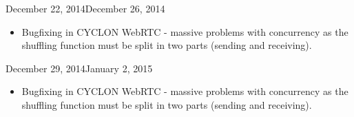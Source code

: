 \documentclass[11pt, english, screen]{report-rd-info}
\begin{document}
\begin{fichesuivi}{December 22, 2014}{December 26, 2014}

   \begin{travaileffectue}
   \end{travaileffectue}

   \begin{travailnoneffectue}
   \begin{itemize}
   \item {Bugfixing in CYCLON WebRTC - massive problems with concurrency as the shuffling function must be split in two parts (sending and receiving).}
      \end{itemize}
   \end{travailnoneffectue}

   \begin{echange}
   \end{echange}

   \begin{planification}
   \end{planification}
\end{fichesuivi}

\begin{fichesuivi}{December 29, 2014}{January 2, 2015}

   \begin{travaileffectue}
   \end{travaileffectue}

   \begin{travailnoneffectue}
   \begin{itemize}
   \item {Bugfixing in CYCLON WebRTC - massive problems with concurrency as the shuffling function must be split in two parts (sending and receiving).}
      \end{itemize}
   \end{travailnoneffectue}

   \begin{echange}
   \end{echange}

   \begin{planification}
   \end{planification}
\end{fichesuivi}
\end{document}
